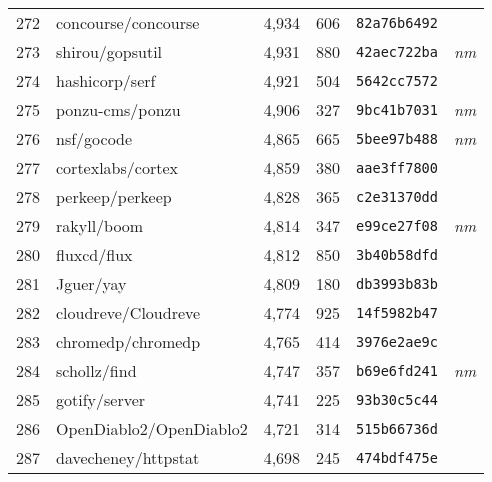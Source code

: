 {\begin{supertabular}{llrrll}
        272 &                concourse/concourse &  4,934 &    606 &  \texttt{82a76b6492} &              \\
        273 &                    shirou/gopsutil &  4,931 &    880 &  \texttt{42aec722ba} &  \textit{nm} \\
        274 &                     hashicorp/serf &  4,921 &    504 &  \texttt{5642cc7572} &              \\
        275 &                    ponzu-cms/ponzu &  4,906 &    327 &  \texttt{9bc41b7031} &  \textit{nm} \\
        276 &                         nsf/gocode &  4,865 &    665 &  \texttt{5bee97b488} &  \textit{nm} \\
        277 &                  cortexlabs/cortex &  4,859 &    380 &  \texttt{aae3ff7800} &              \\
        278 &                    perkeep/perkeep &  4,828 &    365 &  \texttt{c2e31370dd} &              \\
        279 &                        rakyll/boom &  4,814 &    347 &  \texttt{e99ce27f08} &  \textit{nm} \\
        280 &                        fluxcd/flux &  4,812 &    850 &  \texttt{3b40b58dfd} &              \\
        281 &                          Jguer/yay &  4,809 &    180 &  \texttt{db3993b83b} &              \\
        282 &                cloudreve/Cloudreve &  4,774 &    925 &  \texttt{14f5982b47} &              \\
        283 &                  chromedp/chromedp &  4,765 &    414 &  \texttt{3976e2ae9c} &              \\
        284 &                       schollz/find &  4,747 &    357 &  \texttt{b69e6fd241} &  \textit{nm} \\
        285 &                      gotify/server &  4,741 &    225 &  \texttt{93b30c5c44} &              \\
        286 &            OpenDiablo2/OpenDiablo2 &  4,721 &    314 &  \texttt{515b66736d} &              \\
        287 &                davecheney/httpstat &  4,698 &    245 &  \texttt{474bdf475e} &              \\

\end{supertabular}}

